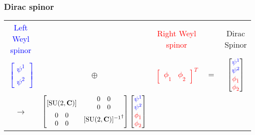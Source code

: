 \documentclass[../main.tex]{subfiles}
\begin{document}
\begin{itemize}
\subsubsection{Dirac spinor}
\begin{center}
\begin{tabular}{ccccc}
\textcolor{blue}{Left Weyl spinor} & & \textcolor{red}{Right Weyl spinor}& &Dirac Spinor\\
\textcolor{blue}{$\left[\begin{matrix}
\psi^1 \\
\psi^2 
\end{matrix}
\right]$} & 
$\oplus$ & 
\textcolor{red}{$\left[\begin{matrix}
\phi_{\dot{1}} &
\phi_{\dot{2}}
\end{matrix}
\right]^T$} & $=$ & 
$\left[\begin{matrix}
\textcolor{blue}{\psi^1} \\
\textcolor{blue}{\psi^2} \\
\textcolor{red}{\phi_{\dot{1}}} \\
\textcolor{red}{\phi_{\dot{2}}} \\
\end{matrix}
\right]$ \\
$\rightarrow$ & 
$\left[\begin{matrix}
[\text{SU}(2,\mathbf{C})] & \begin{matrix}0&0\\0&0\end{matrix} \\
\begin{matrix}0&0\\0&0\end{matrix} & {[\text{SU}(2,\mathbf{C})]^{-1}}^\dagger
\end{matrix}\right]
\left[\begin{matrix}
\textcolor{blue}{\psi^1} \\
\textcolor{blue}{\psi^2} \\
\textcolor{red}{\phi_{\dot{1}}} \\
\textcolor{red}{\phi_{\dot{2}}} \\
\end{matrix}
\right]$ \\
\end{tabular}
\end{center}


\end{itemize}
\end{document}
